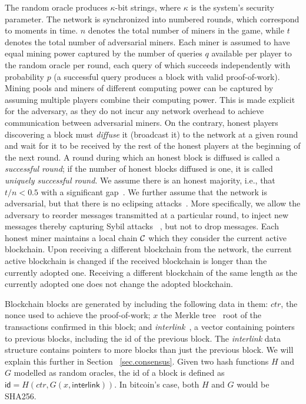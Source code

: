 The random oracle produces $\kappa$-bit strings, where $\kappa$ is the system's
security parameter. The network is synchronized into numbered rounds, which
correspond to moments in time. $n$ denotes the total number of miners in the
game, while $t$ denotes the total number of adversarial miners. Each miner is
assumed to have equal mining power captured by the number of queries $q$
available per player to the random oracle per round, each query of which
succeeds independently with probability $p$ (a successful query produces a block
with valid proof-of-work). Mining pools and miners of different computing power
can be captured by assuming multiple players combine their computing power. This
is made explicit for the adversary, as they do not incur any network overhead to
achieve communication between adversarial miners. On the contrary, honest
players discovering a block must \textit{diffuse} it (broadcast it) to the
network at a given round and wait for it to be received by the rest of the
honest players at the beginning of the next round. A round during which an
honest block is diffused is called a \textit{successful round}; if the number of
honest blocks diffused is one, it is called \textit{uniquely successful round}.
We assume there is an honest majority, i.e., that $t / n < 0.5$ with a
significant gap~\cite{backbone}. We further assume that the network is
adversarial, but that there is no eclipsing attacks~\cite{heilman2015eclipse}.
More specifically, we allow the adversary to reorder messages transmitted at a
particular round, to inject new messages thereby capturing Sybil attacks~
\cite{sybil}, but not to drop messages. Each honest miner maintains a local
chain $\mathcal{C}$ which they consider the current active blockchain. Upon receiving
a different blockchain from the network, the current active blockchain is
changed if the received blockchain is longer than the currently adopted one.
Receiving a different blockchain of the same length as the currently adopted one
does not change the adopted blockchain.

Blockchain blocks are generated by including the following data in them: $ctr$,
the nonce used to achieve the proof-of-work; $x$ the Merkle tree~\cite{merkle}
root of the transactions confirmed in this block; and
\textit{interlink}~\cite{KLS}, a vector containing pointers to previous blocks,
including the id of the previous block. The \textit{interlink} data structure
contains pointers to more blocks than just the previous block. We will explain
this further in Section~ \ref{sec.consensus}. Given two hash functions $H$ and
$G$ modelled as random oracles, the id of a block is defined as $\textsf{id} =
H(ctr, G(x, \textsf{interlink}))$. In bitcoin's case, both $H$ and $G$ would be
SHA256.


